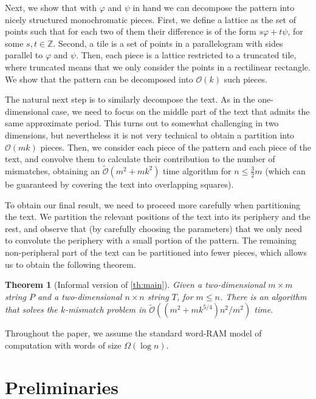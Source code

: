 \documentclass[11pt, letterpaper]{article}
\theoremstyle{plain}
\newtheorem{theorem}{Theorem}
\theoremstyle{definition}
\theoremstyle{remark}
\newcommand{\Z}{\mathbb{Z}}
\renewcommand{\O}{\mathcal{O}}
\newcommand{\tO}{\tilde{\mathcal{O}}}
\renewcommand{\phi}{\varphi}
\begin{document}
Next, we show that with $\phi$ and $\psi$ in hand we can decompose the pattern
into nicely structured monochromatic pieces. First, we define a lattice as the set of points such that for each two of them their difference is
of the form $s\phi+t\psi$, for some $s,t\in \Z$. Second, a tile is a set of points in a parallelogram with sides
parallel to $\phi$ and $\psi$. Then, each piece is a lattice restricted to a truncated tile, where truncated
means that we only consider the points in a rectilinear rectangle. We show that the pattern
can be decomposed into $\O(k)$ such pieces.

The natural next step is to similarly decompose the text. As in the one-dimensional case, we
need to focus on the middle part of the text that admits the same approximate period. This turns out
to somewhat challenging in two dimensions, but nevertheless it is not very technical to obtain
a partition into $\O(mk)$ pieces. Then, we consider each piece of the pattern and each piece of the text,
and convolve them to calculate their contribution to the number of mismatches, obtaining an $\tO(m^{2}+mk^{2})$ time
algorithm for $n\leq \frac{3}{2}m$ (which can be guaranteed by covering the text into overlapping
squares).

To obtain our final result, we need to proceed more carefully when partitioning the text. We partition
the relevant positions of the text into its periphery and the rest, and observe that (by carefully choosing the parameters)
that we only need to convolute the periphery with a small portion of the pattern. The remaining non-peripheral
part of the text can be partitioned into fewer pieces, which allows us to obtain the following theorem.

\begin{theorem}[Informal version of \cref{th:main}]
Given a two-dimensional $m \times m$ string $P$ and a two-dimensional $n \times n$ string $T$, for $m \le n$.
There is an algorithm that solves the $k$-mismatch problem in $\tO((m^2 + mk^{5/4})n^2 / m^2)$ time.
\end{theorem}

\noindent Throughout the paper, we assume the standard word-RAM model of computation with words of size $\Omega(\log n)$.

\section{Preliminaries}
\label{sec:preliminaries}
\newcommand{\x}[1]{#1.x}
\newcommand{\y}[1]{#1.y}
\newcommand{\h}[1]{\phi \times #1}
\newcommand{\s}[1]{\psi \times #1}
\end{document}
